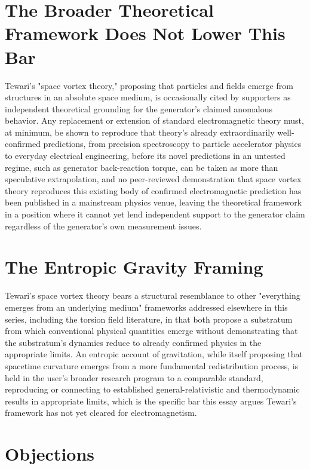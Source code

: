 \documentclass[11pt]{article}
\begin{document}
\section{The Broader Theoretical Framework Does Not Lower This Bar}

Tewari's "space vortex theory," proposing that particles and fields emerge from structures in an absolute space medium, is occasionally cited by supporters as independent theoretical grounding for the generator's claimed anomalous behavior. Any replacement or extension of standard electromagnetic theory must, at minimum, be shown to reproduce that theory's already extraordinarily well-confirmed predictions, from precision spectroscopy to particle accelerator physics to everyday electrical engineering, before its novel predictions in an untested regime, such as generator back-reaction torque, can be taken as more than speculative extrapolation, and no peer-reviewed demonstration that space vortex theory reproduces this existing body of confirmed electromagnetic prediction has been published in a mainstream physics venue, leaving the theoretical framework in a position where it cannot yet lend independent support to the generator claim regardless of the generator's own measurement issues.

\section{The Entropic Gravity Framing}

Tewari's space vortex theory bears a structural resemblance to other "everything emerges from an underlying medium" frameworks addressed elsewhere in this series, including the torsion field literature, in that both propose a substratum from which conventional physical quantities emerge without demonstrating that the substratum's dynamics reduce to already confirmed physics in the appropriate limits. An entropic account of gravitation, while itself proposing that spacetime curvature emerges from a more fundamental redistribution process, is held in the user's broader research program to a comparable standard, reproducing or connecting to established general-relativistic and thermodynamic results in appropriate limits, which is the specific bar this essay argues Tewari's framework has not yet cleared for electromagnetism.

\section{Objections}
\end{document}
